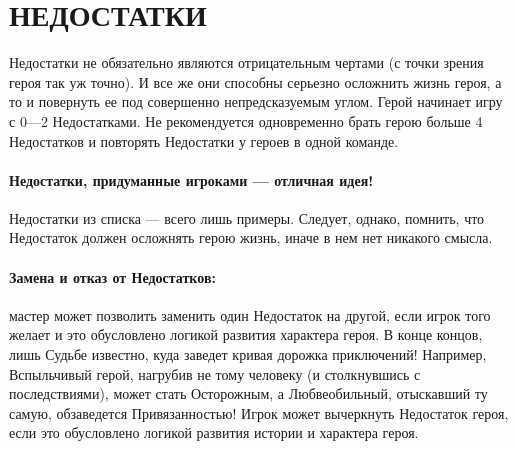 \section{НЕДОСТАТКИ}
Недостатки не обязательно являются отрицательным чертами (с точки зрения героя так уж точно). И все же они способны серьезно осложнить жизнь героя, а то и повернуть ее под совершенно непредсказуемым углом. Герой начинает игру с 0—2 Недостатками. Не рекомендуется одновременно брать герою больше 4 Недостатков и повторять Недостатки у героев в одной команде. 
\paragraph{Недостатки, придуманные игроками — отличная идея!} Недостатки из списка — всего лишь примеры. Следует, однако, помнить, что Недостаток должен осложнять герою жизнь, иначе в нем нет никакого смысла.
\paragraph{Замена и отказ от Недостатков:} мастер может позволить заменить один Недостаток на другой, если игрок того желает и это обусловлено логикой развития характера героя. В конце концов, лишь Судьбе известно, куда заведет кривая дорожка приключений!
Например, Вспыльчивый герой, нагрубив не тому человеку (и столкнувшись с последствиями), может стать Осторожным, а Любвеобильный, отыскавший ту самую, обзаведется Привязанностью! Игрок может вычеркнуть Недостаток героя, если это обусловлено логикой развития истории и характера героя.


